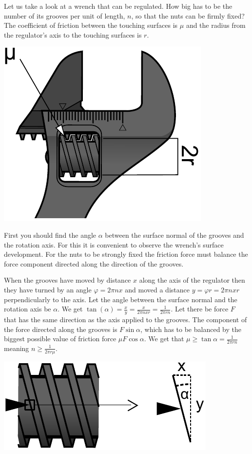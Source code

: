 {\ifEngStatement
Let us take a look at a wrench that can be regulated. How big has to be the number of its grooves per unit of length, $n$, so that the nuts can be firmly fixed? The coefficient of friction between the touching surfaces is $\mu$ and the radius from the regulator’s axis to the touching surfaces is $r$.
\begin{center}%
\includegraphics[width=0.4\linewidth]{2015-lahg-09-mutriv6ti_joonis}%
\end{center}
\fi


\ifEngHint
First you should find the angle $\alpha$ between the surface normal of the grooves and the rotation axis. For this it is convenient to observe the wrench’s surface development. For the nuts to be strongly fixed the friction force must balance the force component directed along the direction of the grooves.
\fi


\ifEngSolution
When the grooves have moved by distance $x$ along the axis of the regulator then they have turned by an angle $\varphi=2\pi nx$ and moved a distance $y=\varphi r=2\pi nxr$ perpendicularly to the axis. Let the angle between the surface normal and the rotation axis be $\alpha$. We get $\tan(\alpha)=\frac{x}{y}=\frac{x}{2\pi nxr}=\frac{1}{2\pi rn}$. Let there be force $F$ that has the same direction as the axis applied to the grooves. The component of the force directed along the grooves is $F\sin\alpha$, which has to be balanced by the biggest possible value of friction force $\mu F\cos\alpha$. We get that $\mu\geq\tan\alpha=\frac{1}{2\pi rn}$ meaning $n\ge\frac{1}{2\pi r\mu}$.
\begin{center}
\includegraphics[width=0.5\linewidth]{2015-lahg-09-mutriv6ti_lahendus}
\end{center}
\fi
}